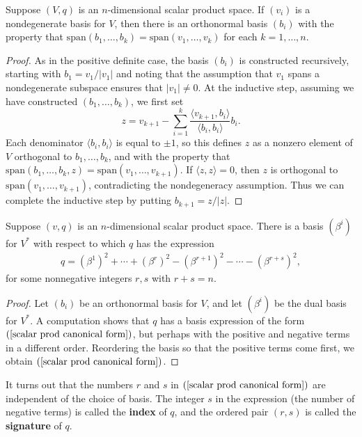 \begin{proposition}
Suppose $(V,q)$ is an $n$-dimensional scalar product space. If $(v_i)$ is a 
nondegenerate basis for $V$, then there is an orthonormal basis $(b_i)$ with 
the property that $\mathrm{span}(b_1,\dots,b_k)=\mathrm{span}(v_1,\dots,v_k)$ 
for each $k=1,\dots,n$.
\end{proposition}
\begin{proof}
As in the positive definite case, the basis $(b_i)$ is constructed recursively, 
starting with $b_1=v_1/|v_1|$ and noting that the assumption that $v_1$ spans 
a nondegenerate subspace ensures that $|v_1|\neq 0$. At the inductive step, 
assuming we have constructed $(b_1,\dots,b_k)$, we first set
\[z=v_{k+1}-\sum_{i=1}^{k}\frac{\langle v_{k+1},b_i\rangle}{\langle b_i,b_i\rangle}b_i.\]
Each denominator $\langle b_i,b_i\rangle$ is equal to $\pm 1$, so this defines 
$z$ as a nonzero element of $V$ orthogonal to $b_1,\dots,b_k$, and with the 
property that $\mathrm{span}(b_1,\dots,b_k,z)=\mathrm{span}(v_1,\dots,v_{k+1})$. 
If $\langle z,z\rangle=0$, then $z$ is orthogonal to $\mathrm{span}(v_1,\dots,v_{k+1})$, 
contradicting the nondegeneracy assumption. Thus we can complete the inductive step 
by putting $b_{k+1}=z/|z|$.
\end{proof}
\begin{corollary}
Suppose $(v,q)$ is an $n$-dimensional scalar product space. There is a basis 
$(\beta^i)$ for $V^*$ with respect to which $q$ has the expression
\begin{align}\label{scalar prod canonical form}
q=(\beta^1)^2+\cdots+(\beta^r)^2-(\beta^{r+1})^2-\cdots-(\beta^{r+s})^2,
\end{align}
for some nonnegative integers $r,s$ with $r+s=n$.
\end{corollary}
\begin{proof}
Let $(b_i)$ be an orthonormal basis for $V$, and let $(\beta^i)$ be the dual 
basis for $V^*$. A computation shows that $q$ has a basis expression of the 
form $(\ref{scalar prod canonical form})$, but perhaps with the positive and 
negative terms in a different order. Reordering the basis so that the positive 
terms come first, we obtain $(\ref{scalar prod canonical form})$.
\end{proof}
It turns out that the numbers $r$ and $s$ in $(\ref{scalar prod canonical form})$ are independent of the choice of
basis. The integer $s$ in the expression (the number of negative terms) is called 
the \textbf{index} of $q$, and the ordered pair $(r,s)$ is called the \textbf{signature} of $q$.\par
